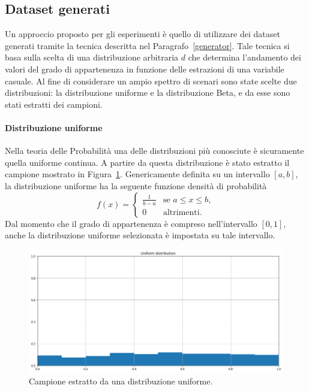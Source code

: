 \documentclass[12pt]{report}
\theoremstyle{definition}
\begin{document}
\subsection{Dataset generati}\label{generated_datasets}
Un approccio proposto per gli esperimenti è quello di utilizzare dei dataset generati tramite la tecnica descritta nel Paragrafo~\ref{generator}. Tale tecnica si basa sulla scelta di una distribuzione arbitraria $d$ che determina l'andamento dei valori del grado di appartenenza in funzione delle estrazioni di una variabile casuale. Al fine di considerare un ampio spettro di scenari sono state scelte due distribuzioni: la distribuzione uniforme e la distribuzione Beta, e da esse sono stati estratti dei campioni.

\paragraph{Distribuzione uniforme}
Nella teoria delle Probabilità una delle distribuzioni più conosciute è sicuramente quella uniforme continua. A partire da questa distribuzione è stato estratto il campione mostrato in Figura~\ref{uniforme}. Genericamente definita su un intervallo $[a,b]$, la distribuzione uniforme ha la seguente funzione densità di probabilità
\begin{equation}
    f(x)= \begin{cases} \frac{1}{b-a} & \mbox{se } a\leq x \leq b, \\ 0 & \mbox{altrimenti.} \end{cases}
\end{equation}
Dal momento che il grado di appartenenza è compreso nell'intervallo $[0,1]$, anche la distribuzione uniforme selezionata è impostata su tale intervallo. 
\begin{figure}
    \centering
    \includegraphics[scale=0.4]{images/uniform.png}
    \caption{Campione estratto da una distribuzione uniforme.}
    \label{uniforme}
\end{figure}
\end{document}
